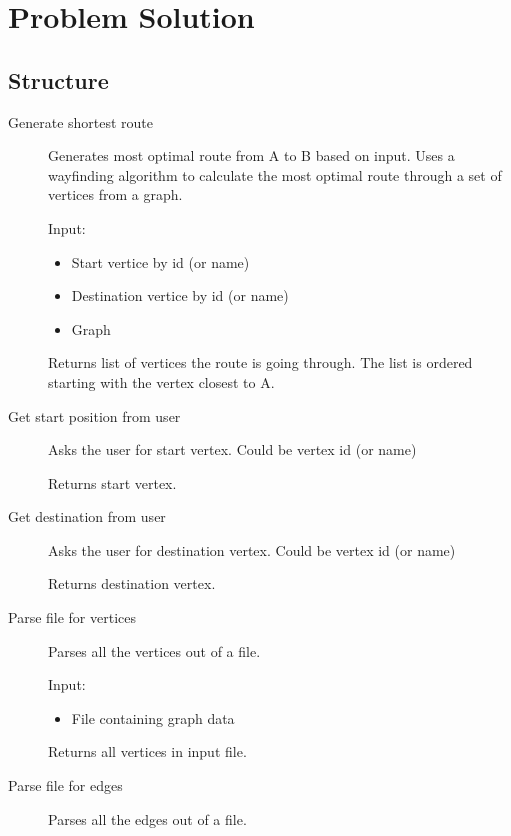 \chapter{Problem Solution}
\label{cha:solution}





\section{Structure} %
\label{sec:structure}

\begin{description}
	\item[Generate shortest route] 
	Generates most optimal route from A to B based on input. Uses a wayfinding algorithm to calculate the most optimal route through a set of vertices from a graph.

	Input:
	\begin{itemize}
		\item Start vertice by id (or name)
		\item Destination vertice by id (or name)
		\item Graph
	\end{itemize}
	Returns list of vertices the route is going through. The list is ordered starting with the vertex closest to A.
	\item[Get start position from user] 
	Asks the user for start vertex. Could be vertex id (or name)

	Returns start vertex.
	\item[Get destination from user] 
	Asks the user for destination vertex. Could be vertex id (or name)

	Returns destination vertex.
	\item[Parse file for vertices] 
	Parses all the vertices out of a file.

	Input:
	\begin{itemize}
		\item File containing graph data
	\end{itemize}
	Returns all vertices in input file.
	\item[Parse file for edges] 
	Parses all the edges out of a file.


\end{description}
